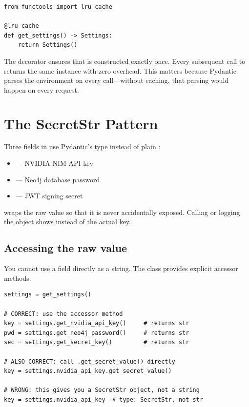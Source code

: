 \begin{lstlisting}[style=python, caption={The singleton pattern for settings access.}]
from functools import lru_cache

@lru_cache
def get_settings() -> Settings:
    return Settings()
\end{lstlisting}

The  decorator ensures that  is constructed
exactly once.  Every subsequent call to  returns the same
instance with zero overhead.  This matters because Pydantic parses the
environment on every  call---without caching, that parsing would
happen on every request.


\section{The SecretStr Pattern}
\label{sec:secretstr-pattern}

Three fields in  use Pydantic's  type instead of
plain :

\begin{itemize}
    \item {} --- NVIDIA NIM API key
    \item {} --- Neo4j database password
    \item {} --- JWT signing secret
\end{itemize}

 wraps the raw value so that it is never accidentally exposed.
Calling  or logging the object shows
 instead of the actual key.

\subsection*{Accessing the raw value}

You cannot use a  field directly as a string.  The 
class provides explicit accessor methods:

\begin{lstlisting}[style=python, caption={Correct vs.\ incorrect access of secret fields.}]
settings = get_settings()

# CORRECT: use the accessor method
key = settings.get_nvidia_api_key()     # returns str
pwd = settings.get_neo4j_password()     # returns str
sec = settings.get_secret_key()         # returns str

# ALSO CORRECT: call .get_secret_value() directly
key = settings.nvidia_api_key.get_secret_value()

# WRONG: this gives you a SecretStr object, not a string
key = settings.nvidia_api_key  # type: SecretStr, not str
\end{lstlisting}

